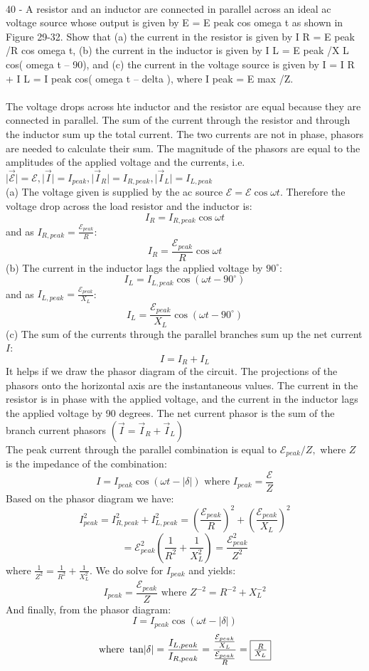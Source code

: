 \documentclass{report}
\begin{document}
\paragraph{}
40 - A resistor and an inductor are connected in parallel across an ideal ac voltage source whose output is given by E = E peak cos omega t as shown in Figure 29-32. Show that (a) the current in the resistor is given by I R = E peak /R cos omega t, (b) the current in the inductor is given by I L = E peak /X L cos( omega t – 90), and (c) the current in the voltage source is given by I = I R + I L = I peak cos( omega t – delta ), where I peak = E max /Z.\\
\\
The voltage drops across hte inductor and the resistor are equal because they are connected in parallel. The sum of the current through the resistor and through the inductor sum up the total current. The two currents are not in phase, phasors are needed to calculate their sum. The magnitude of the phasors are equal to the amplitudes of the applied voltage and the currents, i.e. $\lvert\mathcal{\vec E} \rvert = \mathcal{E}, \lvert \vec I \rvert = I_{peak}, \lvert \vec I_R\rvert = I_{R,peak}, \lvert \vec I_L \rvert = I_{L,peak}$ \\
(a) The voltage given is supplied by the ac source $\mathcal{E} = \mathcal{E}\cos \omega t$. Therefore the voltage drop across the load resistor and the inductor is:
$$I_R = I_{R,peak}\cos \omega t$$
and as $I_{R,peak} = \frac{\mathcal{E}_{peak}}{R}$:
$$I_R = \frac{\mathcal{E}_{peak}}{R}\cos \omega t$$
(b) The current in the inductor lags the applied voltage by $90^{\circ}$:
$$I_L = I_{L,peak} \cos (\omega t - 90^{\circ})$$
and as $I_{L,peak} = \frac{\mathcal{E}_{peak}}{X_L}$:
$$I_L = \frac{\mathcal{E}_{peak}}{X_L}\cos (\omega t - 90^{\circ})$$
(c) The sum of the currents through the parallel branches sum up the net current $I$:
$$I = I_R + I_L$$
It helps if we draw the phasor diagram of the circuit. The projections of the phasors onto the horizontal axis are the instantaneous values. The current in the resistor is in phase with the applied voltage, and the current in the inductor lags the applied voltage by 90 degrees. The net current phasor is the sum of the branch current phasors $(\vec I = \vec I_R + \vec I_L)$\\
The peak current through the parallel combination is equal to $\mathcal{E}_{peak} / Z,$ where $Z$ is the impedance of the combination:
$$I = I_{peak} \cos (\omega t - \lvert \delta \rvert) \text{ where } I_{peak} = \frac{\mathcal{E}}{Z}$$
Based on the phasor diagram we have:
$$I_{peak}^2 = I_{R,peak}^2 + I_{L,peak}^2 = \left( \frac{\mathcal{E}_{peak}}{R} \right)^2 + \left( \frac{\mathcal{E}_{peak}}{X_L} \right)^2$$
$$= \mathcal{E}_{peak}^2\left( \frac{1}{R^2} + \frac{1}{X_L^2} \right) = \frac{\mathcal{E}_{peak}^2}{Z^2}$$
where $\frac{1}{Z^2} = \frac{1}{R^2} + \frac{1}{X_L^2}$. We do solve for $I_{peak}$ and yields:
$$I_{peak} = \frac{\mathcal{E}_{peak}}{Z} \text{ where } Z^{-2} = R^{-2} + X_L^{-2}$$
And finally, from the phasor diagram:
$$I = I_{peak} \cos (\omega t - \lvert \delta \rvert)$$
$$\text{where } \tan \lvert \delta \rvert = \frac{I_{L,peak}}{I_{R,peak}} = \frac{\frac{\mathcal{E}_{peak}}{X_L}}{\frac{\mathcal{E}_{peak}}{R}} = \fbox{$\frac{R}{X_L}$}$$
\end{document}
